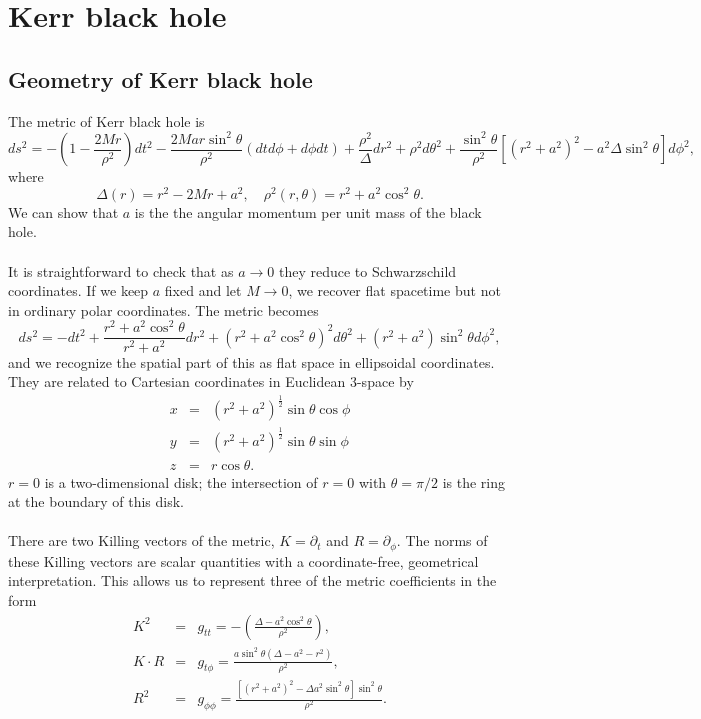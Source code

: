 \section{Kerr black hole}
\subsection{Geometry of Kerr black hole}
The metric of Kerr black hole is
\[ds^2 = -\left(1 - \frac{2Mr}{\rho^2}\right)dt^2 - \frac{2Mar\sin^2\theta}{\rho^2}(dt d\phi + d\phi dt) + \frac{\rho^2}{\Delta} dr^2 + \rho^2d\theta^2 + \frac{\sin^2\theta}{\rho^2} \left[(r^2+a^2)^2 - a^2 \Delta \sin^2\theta\right]d\phi^2,\]
where
\[\Delta(r) = r^2 - 2Mr + a^2, \quad \rho^2(r,\theta) = r^2 + a^2 \cos^2\theta.\]
We can show that $a$ is the the angular momentum per unit mass of the black hole.
\\ \\
It is straightforward to check that as $a \to 0$ they reduce to Schwarzschild coordinates.
If we keep $a$ fixed and let $M \to 0$, we recover flat spacetime but not in ordinary polar coordinates. 
The metric becomes
\[ds^2 = -dt^2 + \frac{r^2+a^2\cos^2\theta}{r^2 + a^2} dr^2 + (r^2 + a^2\cos^2\theta)^2d\theta^2 + (r^2+a^2)\sin^2\theta d\phi^2,\]
and we recognize the spatial part of this as flat space in ellipsoidal coordinates. 
They are related to Cartesian coordinates in Euclidean $3$-space by
\begin{eqnarray}
x &=& (r^2+a^2)^{\frac{1}{2}} \sin\theta \cos\phi \nonumber \\
y &=& (r^2+a^2)^{\frac{1}{2}} \sin\theta \sin\phi \nonumber \\
z &=& r\cos\theta. \nonumber
\end{eqnarray}
$r = 0$ is a two-dimensional disk; the intersection of $r = 0$ with $\theta = \pi / 2$ is the ring at the boundary of this disk.
\\ \\
There are two Killing vectors of the metric, $K = \partial_t$ and $R = \partial_{\phi}$. The norms of these Killing vectors are scalar quantities with a coordinate-free, geometrical interpretation. 
This allows us to represent three of the metric coefficients in the form
\begin{eqnarray}
K^2 &=& g_{tt} = -\left( \frac{\Delta - a^2\cos^2\theta}{\rho^2} \right), \nonumber \\
K\cdot R &=& g_{t\phi} = \frac{a\sin^2\theta(\Delta - a^2 - r^2)}{\rho^2}, \nonumber \\
R^2 &=& g_{\phi\phi} = \frac{[(r^2+a^2)^2-\Delta a^2\sin^2\theta]\sin^2\theta}{\rho^2}. \nonumber
\end{eqnarray}
